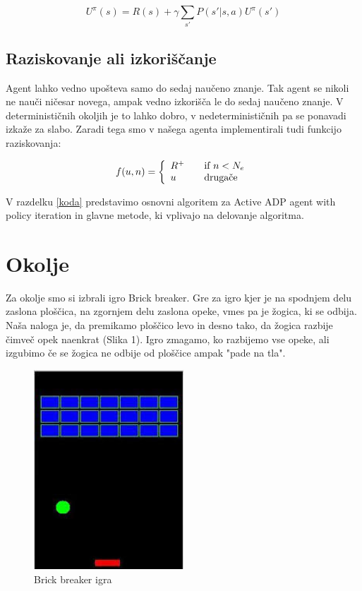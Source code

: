 \documentclass[a4paper]{article}
\begin{document}
\[ U^{\pi} (s) = R(s) + \gamma \sum_{s'} P(s' | s, a)  U^\pi (s') \]

\subsection{Raziskovanje ali izkoriščanje}
Agent lahko vedno upošteva samo do sedaj naučeno znanje. Tak agent se nikoli ne nauči ničesar novega, ampak vedno izkorišča le do sedaj naučeno znanje. V determinističnih okoljih je to lahko dobro, v nedeterminističnih pa se ponavadi izkaže za slabo. Zaradi tega smo v našega agenta implementirali tudi funkcijo raziskovanja:

\[ f(u, n) = \left\{
	\begin{array}{l l}
		R^+ & \quad \text{if $n$} < N_e\\
		u & \quad \text{drugače}
	\end{array}
\right.\]

V razdelku \ref{koda} predstavimo osnovni algoritem za Active ADP agent with policy iteration in glavne metode, ki vplivajo na delovanje algoritma.

\section{Okolje}
Za okolje smo si izbrali igro Brick breaker. Gre za igro kjer je na spodnjem delu zaslona ploščica, na zgornjem delu zaslona opeke, vmes pa je žogica, ki se odbija. Naša naloga je, da premikamo ploščico levo in desno tako, da žogica razbije čimveč opek naenkrat (Slika 1). Igro zmagamo, ko razbijemo vse opeke, ali izgubimo če se žogica ne odbije od ploščice ampak "pade na tla". 

\begin{figure}[H]
\centering
\includegraphics[width=0.5\textwidth]{brick.jpg}
\caption{Brick breaker igra}
\end{figure}
\end{document}
